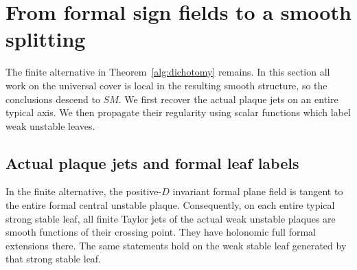 \section{From formal sign fields to a smooth splitting}
\label{smooth:section}

The finite alternative in Theorem~\ref{alg:dichotomy} remains.  In this
section all work on the universal cover is local in the resulting smooth
structure, so the conclusions descend to $SM$.  We first recover the actual
plaque jets on an entire typical axis.  We then propagate their regularity
using scalar functions which label weak unstable leaves.

\subsection{Actual plaque jets and formal leaf labels}

\begin{lemma}
\label{smooth:tangency}
In the finite alternative, the positive-$D$ invariant formal plane field is
tangent to the entire formal central unstable plaque.  Consequently, on each
entire typical strong stable leaf, all finite Taylor jets of the actual weak
unstable plaques are smooth functions of their crossing point.  They have
holonomic full formal extensions there.  The same statements hold on the
weak stable leaf generated by that strong stable leaf.
\end{lemma}

